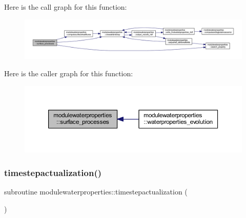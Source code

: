 Here is the call graph for this function\+:\nopagebreak
\begin{figure}[H]
\begin{center}
\leavevmode
\includegraphics[width=350pt]{namespacemodulewaterproperties_a3741d54f8b36c751fb10748ab34af465_cgraph}
\end{center}
\end{figure}
Here is the caller graph for this function\+:\nopagebreak
\begin{figure}[H]
\begin{center}
\leavevmode
\includegraphics[width=350pt]{namespacemodulewaterproperties_a3741d54f8b36c751fb10748ab34af465_icgraph}
\end{center}
\end{figure}
\mbox{\label{namespacemodulewaterproperties_a96402f50a619ea1b6477bb32d13a9020}} 
\subsubsection{\texorpdfstring{timestepactualization()}{timestepactualization()}}
{\footnotesize\ttfamily subroutine modulewaterproperties\+::timestepactualization (\begin{DoxyParamCaption}{ }\end{DoxyParamCaption})\hspace{0.3cm}{\ttfamily [private]}}

